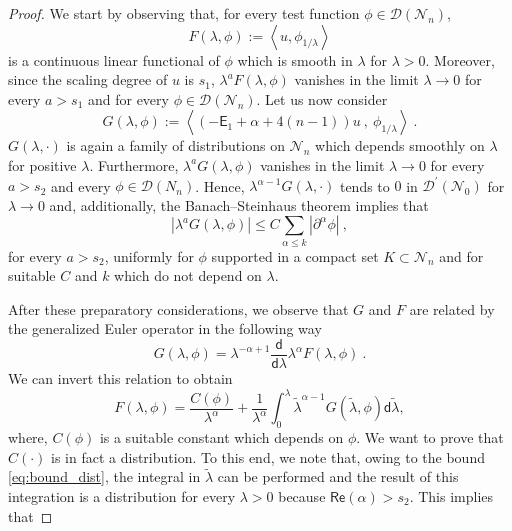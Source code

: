 \documentclass[11pt]{book}
\renewcommand{\Re}{\mathsf{Re}}
\newcommand{\abs}[1]{\left|#1\right|}
\newcommand{\sm}[1]{\left\langle#1\right\rangle}
\newcommand{\Dcal}{\mathcal{D}}
\newcommand{\Ncal}{\mathcal{N}}
\newcommand{\Esf}{\mathsf{E}}
\newcommand{\dsf}{\mathsf{d}}
\theoremstyle{break}
\begin{document}
\begin{proof}
We start by observing that, for every test function $\phi\in\Dcal(\Ncal_n)$, 
%
\begin{equation*}
F(\lambda, \phi) := \sm{ u, \phi_{1/\lambda} } 
\end{equation*}
% 
is a continuous linear functional of $\phi$ which is smooth in $\lambda$ for $\lambda>0$. Moreover, since the scaling degree of $u$ is $s_1$, $\lambda^{a} F(\lambda, \phi)$ vanishes in the limit $\lambda \to 0$ for every $a > s_1$ and for every $\phi\in\Dcal(\Ncal_n)$. Let us now consider 
%
\begin{equation*}
G(\lambda, \phi) :=  \sm{\left(- \Esf_1+\alpha+4(n-1)\right) u \ , \ \phi_{1/\lambda} } \ .
\end{equation*}
%
$G(\lambda, \cdot)$ is again a family of distributions on $\Ncal_n$ which depends smoothly on $\lambda$ for positive $\lambda$. Furthermore, $\lambda^a G(\lambda, \phi)$ vanishes in the limit $\lambda \to 0$ for every $a > s_2$ and every $\phi\in\Dcal(N_n)$. Hence, $\lambda^{\alpha-1} G(\lambda, \cdot)$ tends to $0$ in $\Dcal^\prime(\Ncal_0)$ for $\lambda\to 0$ and, additionally, the Banach--Steinhaus theorem \cite{BOURBAKI_1987} implies that 
%
\begin{equation}
\abs{ \lambda^a G(\lambda,\phi) }  \leq C \sum_{\alpha\leq k} \abs{\partial^{\alpha} \phi} \ ,
\label{eq:bound_dist}
\end{equation}
%
for every $a>s_2$, uniformly for $\phi$ supported in a compact set $K\subset \Ncal_n$ and for suitable $C$ and $k$ which do not depend on $\lambda$.\par%
%
After these preparatory considerations, we observe that $G$ and $F$ are related by the generalized Euler operator in the following way
%
\begin{equation*}
G(\lambda, \phi) =  \lambda^{-\alpha+1} \frac{\dsf}{\dsf\lambda} \lambda^{\alpha} F(\lambda, \phi) \ . 
\end{equation*}
%
We can invert this relation to obtain
%
\begin{equation*}
F(\lambda, \phi) =  \frac{C(\phi)}{\lambda^{\alpha}} + \frac{1}{\lambda^\alpha} \int_0^\lambda  \tilde{\lambda}^{\alpha-1} G(\tilde{\lambda}, \phi) \dsf\tilde{\lambda}, 
\end{equation*}
%
where, $C(\phi)$ is a suitable constant which depends on $\phi$. We want to prove that $C(\cdot)$ is in fact a distribution. To this end, we note that, owing to the bound \eqref{eq:bound_dist}, the integral in $\tilde\lambda$ can be performed and the result of this integration is a distribution for every $\lambda > 0$ because $\Re(\alpha) > s_2$. This implies that 

\end{proof}
\end{document}

